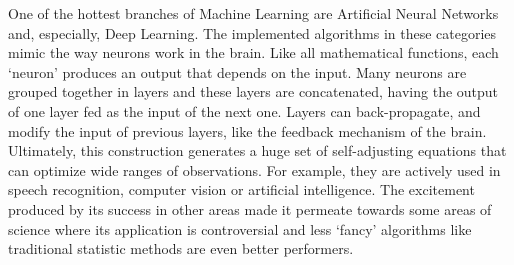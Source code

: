 One of the hottest branches of Machine Learning are Artificial Neural Networks and, especially, Deep Learning. The implemented algorithms in these categories mimic the way neurons work in the brain. Like all mathematical functions, each ‘neuron’ produces an output that depends on the input. Many neurons are grouped together in layers and these layers are concatenated, having the output of one layer fed as the input of the next one. Layers can back-propagate, and modify the input of previous layers, like the feedback mechanism of the brain. Ultimately, this construction generates a huge set of self-adjusting equations that can optimize wide ranges of observations. For example, they are actively used in speech recognition, computer vision or artificial intelligence. The excitement produced by its success in other areas made it permeate towards some areas of science where its application is controversial and less ‘fancy’ algorithms like traditional statistic methods are even better performers.\cite{makridakis2018statistical}

